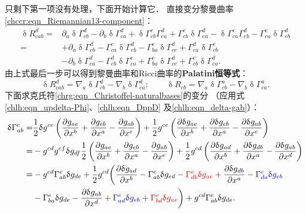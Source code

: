 只剩下第一项没有处理，下面开始计算它．
直接变分黎曼曲率\eqref{chccr:eqn_Riemannian13-component}：
\begin{align*}
    \updelta R_{cab}^d =& \partial_a \updelta\Gamma_{cb}^{d} -\partial_b \updelta\Gamma_{ca}^{d}
    + \updelta\Gamma_{cb}^{e} \Gamma_{ea}^{d} + \Gamma_{cb}^{e} \updelta\Gamma_{ea}^{d}
    - \updelta\Gamma_{ca}^{e} \Gamma_{eb}^{d} - \Gamma_{ca}^{e} \updelta\Gamma_{eb}^{d} \\
    =&+\partial_a \updelta\Gamma_{cb}^{d} - \Gamma_{ca}^{e} \updelta\Gamma_{eb}^{d}
    - \Gamma_{ba}^{e} \updelta\Gamma_{ce}^{d}  + \Gamma_{ea}^{d} \updelta\Gamma_{cb}^{e} \\
    &-\partial_b \updelta\Gamma_{ca}^{d} - \Gamma_{eb}^{d}\updelta\Gamma_{ca}^{e}
    + \Gamma_{ba}^{e} \updelta\Gamma_{ce}^{d} + \Gamma_{cb}^{e} \updelta\Gamma_{ea}^{d} .
\end{align*}
由上式最后一步可以得到黎曼曲率和Ricci曲率的{\heiti \bfseries Palatini恒等式}：
\begin{equation}\label{chlh:eqn_Palatini}
    \updelta R_{cab}^d = \nabla_a \updelta\Gamma_{cb}^{d} -\nabla_b \updelta\Gamma_{ca}^{d}; \qquad
    \updelta R_{cb} = \nabla_a \updelta\Gamma_{cb}^{a} -\nabla_b \updelta\Gamma_{ca}^{a} .
\end{equation}
下面求克氏符\eqref{chrg:eqn_Christoffel-naturalbases}的变分
（应用式\eqref{chlh:eqn_updelta-Phi}、\eqref{chlh:eqn_DppD}
及\eqref{chlh:eqn_delta-gab}）：
\begin{align*}
    \updelta \Gamma_{ab}^c =& \frac{1}{2} \updelta {g^{ce}}
       \left( \frac{\partial g_{ae} }{\partial x^b }
       + \frac{\partial g_{eb}}{\partial x^a} - \frac{\partial g_{ab}}{\partial x^e} \right)
     +\frac{1}{2}{g^{ce}}\left( \frac{\partial\updelta g_{ae} }{\partial x^b }
     + \frac{\partial\updelta g_{eb}}{\partial x^a}
     - \frac{\partial\updelta g_{ab}}{\partial x^e} \right)  \\
     =&  -g^{cd} g^{ef} \updelta g_{df} \frac{1}{2}
     \left( \frac{\partial g_{ae} }{\partial x^b }
     + \frac{\partial g_{eb}}{\partial x^a} - \frac{\partial g_{ab}}{\partial x^e} \right)
     +\frac{1}{2}{g^{cd}}\left( \frac{\partial\updelta g_{ad} }{\partial x^b }
     + \frac{\partial\updelta g_{db}}{\partial x^a}
     - \frac{\partial\updelta g_{ab}}{\partial x^d} \right)  \\
     =&  -g^{cd} \Gamma_{ab}^e \updelta g_{de}
     +\frac{1}{2}{g^{cd}}\biggl(
     \frac{\partial\updelta g_{ad} }{\partial x^b }
          - \Gamma^e_{ab} \updelta g_{ed}
          - {\color{red}\Gamma^e_{db} \updelta g_{ae}}
     + \frac{\partial\updelta g_{db}}{\partial x^a}
          - {\color{blue}\Gamma^e_{da} \updelta g_{eb}} \\
     & - \Gamma^e_{ba} \updelta g_{de}
     - \frac{\partial\updelta g_{ab}}{\partial x^d}
          + {\color{blue}\Gamma^e_{ad} \updelta g_{eb} }
          + {\color{red}\Gamma^e_{bd} \updelta g_{ae}} \biggr)
          + g^{cd} \Gamma_{ab}^e \updelta g_{de}  .
\end{align*}
